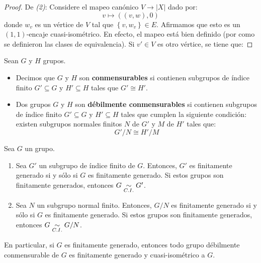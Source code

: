 \documentclass[12pt]{report}
\newcounter{it}
\theoremstyle{largebreak}
\newcommand\abs[1]{\ensuremath{\left|#1\right|}}
\begin{document}
    \begin{proof}
        De \textit{(2)}: Considere el mapeo canónico $V\rightarrow\abs{X}$ dado por:
        \begin{equation*}
            v\mapsto ((v,w),0)
        \end{equation*}
        donde $w_v$ es un vértice de $V$ tal que $\left\{v,w_v \right\}\in E$. Afirmamos que esto es un $(1,1)$-encaje cuasi-isométrico. En efecto, el mapeo está bien definido (por como se definieron las clases de equivalencia). Si $v'\in V$ es otro vértice, se tiene que: 
    \end{proof}

    \begin{mydef}
        Sean $G$ y $H$ grupos.
        \begin{itemize}
            \item Decimos que $G$ y $H$ son \textbf{conmensurables} si contienen subgrupos de índice finito $G'\subseteq G$ y $H'\subseteq H$ tales que $G'\cong H'$.
            \item Dos grupos $G$ y $H$ son \textbf{débilmente conmensurables} si contienen subgrupos de índice finito $G'\subseteq G$ y $H'\subseteq H$ tales que cumplen la siguiente condición: existen subgrupos normales finitos $N$ de $G'$ y $M$ de $H'$ tales que:
            \begin{equation*}
                G'/N\cong H'/M
            \end{equation*}
        \end{itemize}
    \end{mydef}

    \begin{excer}
        Sea $G$ un grupo.
        \begin{enumerate}[label = \textit{(\arabic*)}]
            \item Sea $G'$ un subgrupo de índice finito de $G$. Entonces, $G'$ es finitamente generado si y sólo si $G$ es finitamente generado. Si estos grupos son finitamente generados, entonces $G\underset{C.I.}{\sim} G'$.
            \item Sea $N$ un subgrupo normal finito. Entonces, $G/N$ es finitamente generado si y sólo si $G$ es finitamente generado. Si estos grupos son finitamente generados, entonces $G\underset{C.I.}{\sim} G/N$.
        \end{enumerate}
        En particular, si $G$ es finitamente generado, entonces todo grupo débilmente conmensurable de $G$ es finitamente generado y cuasi-isométrico a $G$.
    \end{excer}
\end{document}
